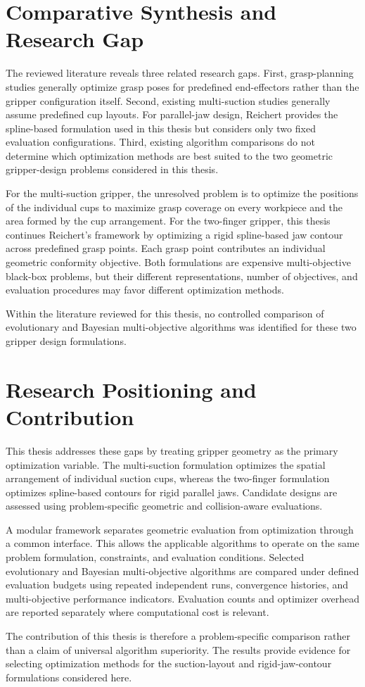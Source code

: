 \section{Comparative Synthesis and Research Gap}
\label{subsec:research_gap}

The reviewed literature reveals three related research gaps. First, grasp-planning studies generally optimize grasp poses for predefined end-effectors
rather than the gripper configuration itself. Second, existing multi-suction studies generally assume predefined cup layouts. For parallel-jaw
design, Reichert \cite{reichert2024greiferoptimierung} provides the spline-based formulation used in this thesis but considers only
two fixed evaluation configurations. Third, existing algorithm comparisons do not determine which optimization methods are best
suited to the two geometric gripper-design problems considered in this thesis.

For the multi-suction gripper, the unresolved problem is to optimize the positions of the individual cups to maximize grasp coverage on every
workpiece and the area formed by the cup arrangement. For the two-finger gripper, this thesis continues Reichert's framework by optimizing a rigid
spline-based jaw contour across predefined grasp points. Each grasp point contributes an individual geometric conformity objective. Both
formulations are expensive multi-objective black-box problems, but their different representations, number of objectives, and evaluation procedures
may favor different optimization methods.

Within the literature reviewed for this thesis, no controlled comparison of evolutionary and Bayesian multi-objective algorithms was identified for
these two gripper design formulations.

\section{Research Positioning and Contribution}
\label{subsec:research_positioning}

This thesis addresses these gaps by treating gripper geometry as the primary optimization variable. The multi-suction formulation optimizes the
spatial arrangement of individual suction cups, whereas the two-finger formulation optimizes spline-based contours for rigid parallel jaws. Candidate
designs are assessed using problem-specific geometric and collision-aware evaluations.

A modular framework separates geometric evaluation from optimization through a common interface. This allows the applicable algorithms to operate on
the same problem formulation, constraints, and evaluation conditions. Selected evolutionary and Bayesian multi-objective algorithms are compared under
defined evaluation budgets using repeated independent runs, convergence histories, and multi-objective performance indicators.
Evaluation counts and optimizer overhead are reported separately where computational cost is relevant.

The contribution of this thesis is therefore a problem-specific comparison rather than a claim of universal algorithm superiority. The results provide
evidence for selecting optimization methods for the suction-layout and rigid-jaw-contour formulations considered here.